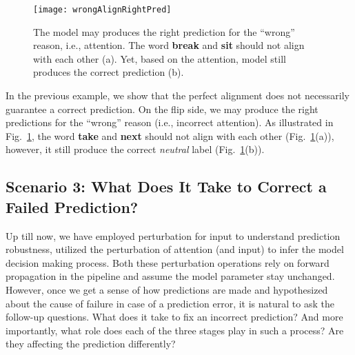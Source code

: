 \begin{figure}[htbp]
\centering
\vspace{-2mm}
 \texttt{[image: wrongAlignRightPred]}
 \caption{
The model may produces the right prediction for the ``wrong'' reason, i.e., attention.
The word \textbf{break} and \textbf{sit} should not align with each other (a). Yet, based on the attention, model still produces the correct prediction (b).
}
\label{fig:wrongAlignRightPred}
\end{figure}


In the previous example, we show that the perfect alignment does not necessarily guarantee a correct prediction.
%
On the flip side, we may produce the right predictions for the ``wrong'' reason (i.e., incorrect attention). 
As illustrated in Fig.~\ref{fig:wrongAlignRightPred}, the word \textbf{take} and \textbf{next} should not align with each other (Fig.~\ref{fig:wrongAlignRightPred}(a)), however, it still produce the correct \emph{neutral} label (Fig.~\ref{fig:wrongAlignRightPred}(b)).
%






\subsection{Scenario 3: What Does It Take to Correct a Failed Prediction?}
Up till now, we have employed perturbation for input to understand prediction robustness, utilized the perturbation of attention (and input) to infer the model decision making process. Both these perturbation operations rely on forward propagation in the pipeline and assume the model parameter stay unchanged.
%
However, once we get a sense of how predictions are made and hypothesized about the cause of failure in case of a prediction error, it is natural to ask the follow-up questions. What does it take to fix an incorrect prediction? And more importantly, what role does each of the three stages play in such a process? Are they affecting the prediction differently?

